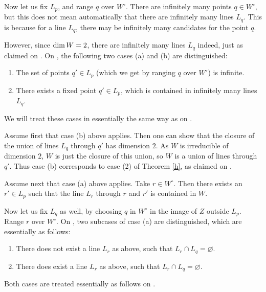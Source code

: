 \documentclass[12pt]{article}
\theoremstyle{definition}
\theoremstyle{remark}
\def\dim{{\rm dim}}
\begin{document}
Now let us fix $L_p$, and range $q$ over $W^{\circ}$. There are infinitely
many points $q \in W^{\circ}$, but this does not mean automatically that 
there are infinitely many lines $L_q$. This is because for a line $L_q$, 
there may be infinitely many candidates for the point $q$. 

However, since $\dim\, W = 2$, there are infinitely many lines $L_q$ indeed,
just as claimed on \cite[p.\@ 565]{GNzzz}. On \cite[pp.\@ 565, 566]{GNzzz}, the following two 
cases (a) and (b) are distinguished:
\begin{enumerate}

\item[(a)] The set of points $q' \in L_p$ (which we get by ranging $q$ over
$W^{\circ}$) is infinite.

\item[(b)] There exists a fixed point $q' \in L_p$, which is contained in infinitely
many lines $L_q$.

\end{enumerate}
We will treat these cases in essentially the same way as on \cite[pp.\@ 566, 568]{GNzzz}.

Assume first that case (b) above applies. 
Then one can show that the closure of the union of lines $L_q$ through $q'$ 
has dimension $2$. As $W$ is irreducible of dimension $2$,
$W$ is just the closure of this union, so $W$ is a union of lines through $q'$. 
Thus case (b) corresponds to case (2) of Theorem \ref{h}, as claimed on \cite[p.\@ 568]{GNzzz}.

Assume next that case (a) above applies. Take $r \in W^{\circ}$. Then there exists an $r' \in L_p$ 
such that the line $L_r$ through $r$ and $r'$ is contained in $W$. 

Now let us fix $L_q$ as well, by choosing $q$ in $W^{\circ}$ in the image of $Z$ outside $L_p$.  Range $r$ over $W^{\circ}$. 
On \cite[p.\@ 566]{GNzzz}, two subcases of case (a) are distinguished, which are essentially as follows:
\begin{enumerate}

\item[(a1)] There does not exist a line $L_r$ as above, such that $L_r \cap L_q = \varnothing$.

\item[(a2)] There does exist a line $L_r$ as above, such that $L_r \cap L_q = \varnothing$.

\end{enumerate}
Both cases are treated essentially as follows on \cite[p.\@ 566]{GNzzz}.
\end{document}
